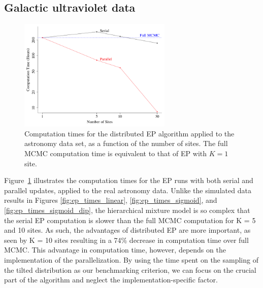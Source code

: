 \subsection{Galactic ultraviolet data}
\label{subsec:ep_results_astro}

\begin{figure}
\centering
   \includegraphics[width=0.65\textwidth]{figures/astro_times}
\caption{Computation times for the distributed EP algorithm applied to the astronomy data set, as a function of the number of sites. The full MCMC computation time is equivalent to that of EP with $K=1$ site.}\label{fig:astro_times}
\end{figure}

Figure~\ref{fig:astro_times} illustrates the computation times for the EP runs with both serial and parallel updates, applied to the real astronomy data. Unlike the simulated data results in Figures \ref{fig:ep_times_linear}, \ref{fig:ep_times_sigmoid}, and \ref{fig:ep_times_sigmoid_dip}, the hierarchical mixture model is so complex that the serial EP computation is slower than the full MCMC computation for K = 5 and 10 sites. As such, the advantages of distributed EP are more important, as seen by K = 10 sites resulting in a 74\% decrease in computation time over full MCMC. This advantage in computation time, however, depends on the implementation of the parallelization. By using the time spent on the sampling of the tilted distribution as our benchmarking criterion, we can focus on the crucial part of the algorithm and neglect the implementation-specific factor.

